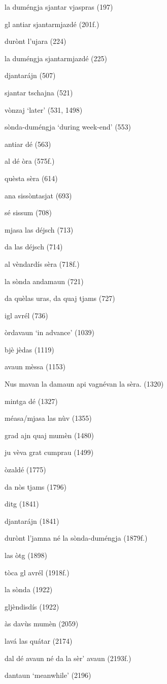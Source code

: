 la duméngja sjantar vjaspras (197)

gl antiar sjantarmjazdé (201f.)

durònt l'ujara (224)

la duméngja sjantarmjazdé (225)

djantarájn (507)

sjantar tschajna (521)

vònzaj `later' (531, 1498)

sònda-duméngja `during week-end' (553)

antiar dé (563)

al dé òra (575f.)

quèsta sèra (614)

ana sissòntasjat (693)

sé sissum (708)

mjasa las déjsch (713)

da las déjsch (714)

al vèndardís sèra (718f.)

la sònda andamaun (721)

da quèlas uras, da quaj tjams (727)

igl avrél (736)

òrdavaun `in advance' (1039)

bjè jèdas (1119)

avaun mèssa (1153)

Nus mavan la damaun api vagnévan la sèra. (1320)

mintga dé (1327)

méasa/mjasa las nùv (1355)

grad ajn quaj mumèn (1480)

ju vèva grat cumprau (1499)

òzaldé (1775)

da nòs tjams (1796)

ditg (1841)

djantarájn (1841)

durònt l'jamna né la sònda-duméngja (1879f.)

las òtg (1898)

tòca gl avrél (1918f.)

la sònda (1922)

gljèndisdís (1922)

às davùs mumèn (2059)

lavá las quátar (2174)

dal dé avaun né da la sèr' avaun (2193f.)

dantaun `meanwhile' (2196)

